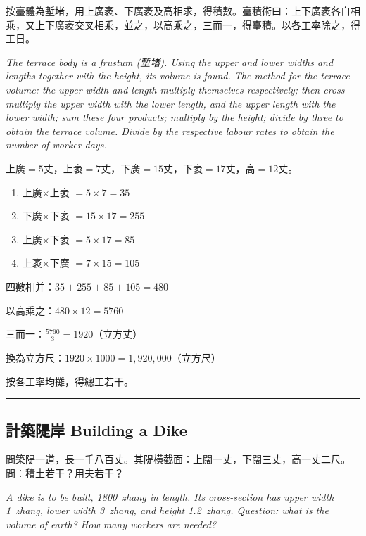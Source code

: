 \documentclass[11pt,a4paper]{article}
\newcommand{\longline}{\noindent\rule{\textwidth}{0.4pt}}
\begin{document}
\begin{method}
按臺體為塹堵，用上廣袤、下廣袤及高相求，得積數。臺積術曰：上下廣袤各自相乘，又上下廣袤交叉相乘，並之，以高乘之，三而一，得臺積。以各工率除之，得工日。

\textit{The terrace body is a frustum (塹堵). Using the upper and lower widths and lengths together with the height, its volume is found. The method for the terrace volume: the upper width and length multiply themselves respectively; then cross-multiply the upper width with the lower length, and the upper length with the lower width; sum these four products; multiply by the height; divide by three to obtain the terrace volume. Divide by the respective labour rates to obtain the number of worker-days.}
\end{method}

\begin{working}
上廣$=5$丈，上袤$=7$丈，下廣$=15$丈，下袤$=17$丈，高$=12$丈。

\begin{enumerate}
  \item 上廣$\times$上袤 $= 5 \times 7 = 35$
  \item 下廣$\times$下袤 $= 15 \times 17 = 255$
  \item 上廣$\times$下袤 $= 5 \times 17 = 85$
  \item 上袤$\times$下廣 $= 7 \times 15 = 105$
\end{enumerate}

四數相并：$35 + 255 + 85 + 105 = 480$

以高乘之：$480 \times 12 = 5760$

三而一：$\displaystyle\frac{5760}{3} = 1920$（立方丈）

換為立方尺：$1920 \times 1000 = 1{,}920{,}000$（立方尺）

按各工率均攤，得總工若干。
\end{working}

\vspace{0.5em}
\longline

\subsection{計築隄岸 \quad Building a Dike}

\begin{problem}
問築隄一道，長一千八百丈。其隄橫截面：上闊一丈，下闊三丈，高一丈二尺。問：積土若干？用夫若干？

\textit{A dike is to be built, 1800~zhang in length. Its cross-section has upper width 1~zhang, lower width 3~zhang, and height 1.2~zhang. Question: what is the volume of earth? How many workers are needed?}
\end{problem}
\end{document}
